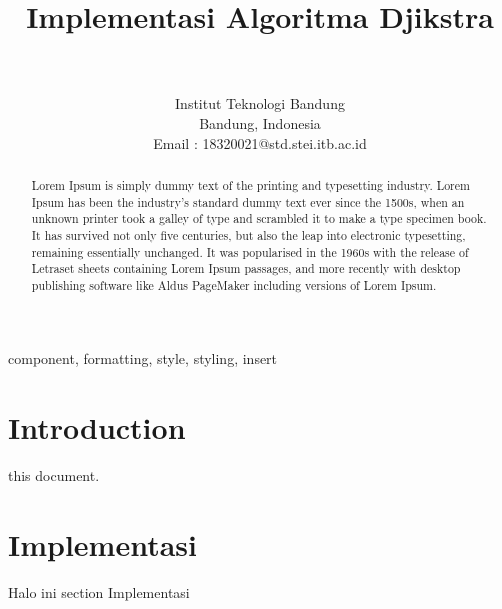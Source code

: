 \documentclass[conference]{IEEEtran}
\title{Implementasi Algoritma Djikstra}
\author{\IEEEauthorblockN{Fannan Bachtiar} \\
\IEEEauthorblockA{\textit{School of Engineering and Informatics}}\\
{Institut Teknologi Bandung}\\
Bandung, Indonesia\\
Email : 18320021@std.stei.itb.ac.id}
\begin{document}
\maketitle

\begin{abstract}
    Lorem Ipsum is simply dummy text of the printing and typesetting industry. Lorem Ipsum has been the industry's standard dummy text ever since the 1500s, when an unknown printer took a galley of type and scrambled it to make a type specimen book. It has survived not only five centuries, but also the leap into electronic typesetting, remaining essentially unchanged. It was popularised in the 1960s with the release of Letraset sheets containing Lorem Ipsum passages, and more recently with desktop publishing software like Aldus PageMaker including versions of Lorem Ipsum.
\end{abstract}

\begin{IEEEkeywords}
    component, formatting, style, styling, insert
\end{IEEEkeywords}

\section{Introduction}
this document.~\cite{he2022application}

\begin{figure}[htbp]
    
\end{figure}


\section{Implementasi}
Halo ini section Implementasi




\end{document}
